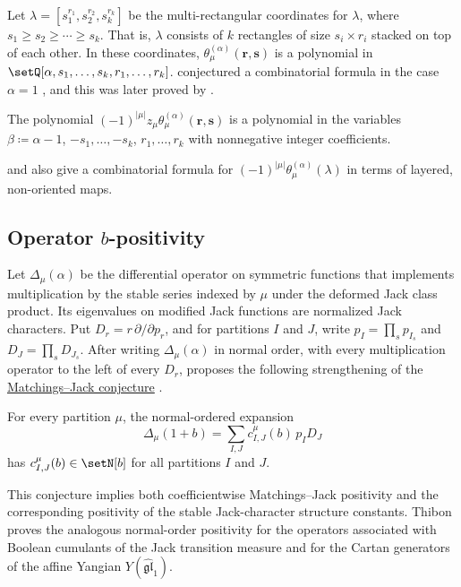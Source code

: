 Let $\lambda = [s_1^{r_1}, s_2^{r_2}, s_k^{r_k}]$ be the multi-rectangular
coordinates for $\lambda$, where $s_1 \geq s_2 \geq \dotsb \geq s_k$.
That is, $\lambda$ consists of $k$
rectangles of size $s_i \times r_i$ stacked on top of each other.
In these coordinates,
$\theta_{\mu}^{(\alpha)}(\mathbf{r},\mathbf{s})$ is a polynomial in
$\setQ[\alpha,s_1,\dotsc,s_k,r_1,\dotsc,r_k]$.
 conjectured a combinatorial formula in the case
$\alpha=1$ \cite{Stanley2003}, and this was later proved by
 \cite{Feray2010}.

\begin{theorem}
The polynomial
$(-1)^{|\mu|}z_\mu \theta_{\mu}^{(\alpha)}(\mathbf{r},\mathbf{s})$
is a polynomial in the variables
$\beta\coloneqq \alpha-1$, $-s_1,\dotsc,-s_k$, $r_1,\dotsc,r_k$
with nonnegative integer coefficients.
\end{theorem}

 and  also give a
combinatorial formula for
$(-1)^{|\mu|}\theta_{\mu}^{(\alpha)}(\lambda)$ in terms of
layered, non-oriented maps.

\subsection[jackOperatorBPositivity]{Operator $b$-positivity}

Let $\Delta_\mu(\alpha)$ be the differential operator on symmetric functions
that implements multiplication by the stable series indexed by $\mu$ under
the deformed Jack class product.  Its eigenvalues on modified Jack functions
are normalized Jack characters.  Put $D_r=r\,\partial/\partial p_r$, and for
partitions $I$ and $J$, write $p_I=\prod_s p_{I_s}$ and
$D_J=\prod_s D_{J_s}$.  After writing $\Delta_\mu(\alpha)$ in normal order,
with every multiplication operator to the left of every $D_r$,
 proposes the following strengthening of the
\hyperref[jackConnectionCoefficients]{Matchings--Jack conjecture}
\cite[Conj.~2.3]{Thibon2026x}.

\begin{conjecture}[Thibon]
For every partition $\mu$, the normal-ordered expansion
\[
\Delta_\mu(1+b)=\sum_{I,J}c^\mu_{I,J}(b)\,p_I D_J
\]
has $c^\mu_{I,J}(b)\in\setN[b]$ for all partitions $I$ and $J$.
\end{conjecture}

This conjecture implies both coefficientwise Matchings--Jack positivity and
the corresponding positivity of the stable Jack-character structure
constants.  Thibon proves the analogous normal-order positivity for the
operators associated with Boolean cumulants of the Jack transition measure
and for the Cartan generators of the affine Yangian
$Y(\widehat{\mathfrak{gl}}_1)$.
